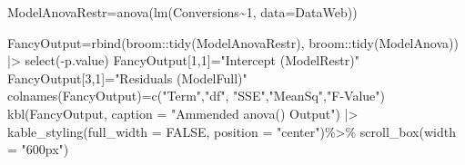 \documentclass[
  letterpaper,
  DIV=11,
  numbers=noendperiod]{scrartcl}
\newenvironment{Shaded}{\begin{snugshade}}{\end{snugshade}}
\newcommand{\AttributeTok}[1]{\textcolor[rgb]{0.40,0.45,0.13}{#1}}
\newcommand{\ConstantTok}[1]{\textcolor[rgb]{0.56,0.35,0.01}{#1}}
\newcommand{\DecValTok}[1]{\textcolor[rgb]{0.68,0.00,0.00}{#1}}
\newcommand{\FunctionTok}[1]{\textcolor[rgb]{0.28,0.35,0.67}{#1}}
\newcommand{\NormalTok}[1]{\textcolor[rgb]{0.00,0.23,0.31}{#1}}
\newcommand{\OtherTok}[1]{\textcolor[rgb]{0.00,0.23,0.31}{#1}}
\newcommand{\SpecialCharTok}[1]{\textcolor[rgb]{0.37,0.37,0.37}{#1}}
\newcommand{\StringTok}[1]{\textcolor[rgb]{0.13,0.47,0.30}{#1}}
\begin{document}
\begin{Shaded}
\begin{Highlighting}[]
\NormalTok{ModelAnovaRestr}\OtherTok{=}\FunctionTok{anova}\NormalTok{(}\FunctionTok{lm}\NormalTok{(Conversions}\SpecialCharTok{\textasciitilde{}}\DecValTok{1}\NormalTok{, }\AttributeTok{data=}\NormalTok{DataWeb))}

\NormalTok{FancyOutput}\OtherTok{=}\FunctionTok{rbind}\NormalTok{(broom}\SpecialCharTok{::}\FunctionTok{tidy}\NormalTok{(ModelAnovaRestr), }
\NormalTok{                  broom}\SpecialCharTok{::}\FunctionTok{tidy}\NormalTok{(ModelAnova)) }\SpecialCharTok{|\textgreater{}} 
                  \FunctionTok{select}\NormalTok{(}\SpecialCharTok{{-}}\NormalTok{p.value)}
\NormalTok{FancyOutput[}\DecValTok{1}\NormalTok{,}\DecValTok{1}\NormalTok{]}\OtherTok{=}\StringTok{"Intercept (ModelRestr)"}
\NormalTok{FancyOutput[}\DecValTok{3}\NormalTok{,}\DecValTok{1}\NormalTok{]}\OtherTok{=}\StringTok{"Residuals (ModelFull)"}
\FunctionTok{colnames}\NormalTok{(FancyOutput)}\OtherTok{=}\FunctionTok{c}\NormalTok{(}\StringTok{"Term"}\NormalTok{,}\StringTok{"df"}\NormalTok{, }\StringTok{"SSE"}\NormalTok{,}\StringTok{"MeanSq"}\NormalTok{,}\StringTok{"F{-}Value"}\NormalTok{)}
\FunctionTok{kbl}\NormalTok{(FancyOutput, }\AttributeTok{caption =} \StringTok{"Ammended anova() Output"}\NormalTok{) }\SpecialCharTok{|\textgreater{}} 
   \FunctionTok{kable\_styling}\NormalTok{(}\AttributeTok{full\_width =} \ConstantTok{FALSE}\NormalTok{, }\AttributeTok{position =} \StringTok{"center"}\NormalTok{)}\SpecialCharTok{\%\textgreater{}\%}    \FunctionTok{scroll\_box}\NormalTok{(}\AttributeTok{width =} \StringTok{"600px"}\NormalTok{)                 }
\end{Highlighting}
\end{Shaded}

\begin{table}

\caption{\label{tbl-ANOVA}}


\end{table}%
\end{document}
